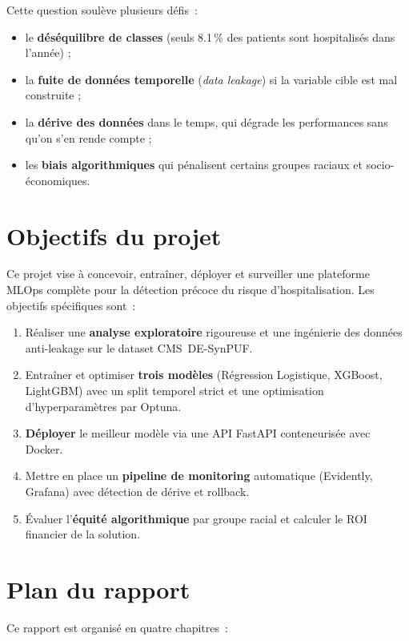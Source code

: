 \noindent Cette question soulève plusieurs défis~:
\begin{itemize}
  \item le \textbf{déséquilibre de classes} (seuls 8.1\,\% des patients sont
        hospitalisés dans l'année) ;
  \item la \textbf{fuite de données temporelle} (\textit{data leakage}) si la
        variable cible est mal construite ;
  \item la \textbf{dérive des données} dans le temps, qui dégrade les performances
        sans qu'on s'en rende compte ;
  \item les \textbf{biais algorithmiques} qui pénalisent certains groupes raciaux
        et socio-économiques.
\end{itemize}

\section*{Objectifs du projet}

Ce projet vise à concevoir, entraîner, déployer et surveiller une plateforme MLOps
complète pour la détection précoce du risque d'hospitalisation. Les objectifs
spécifiques sont~:

\begin{enumerate}
  \item Réaliser une \textbf{analyse exploratoire} rigoureuse et une ingénierie
        des données anti-leakage sur le dataset CMS~DE-SynPUF.
  \item Entraîner et optimiser \textbf{trois modèles} (Régression Logistique,
        XGBoost, LightGBM) avec un split temporel strict et une optimisation
        d'hyperparamètres par Optuna.
  \item \textbf{Déployer} le meilleur modèle via une API FastAPI conteneurisée
        avec Docker.
  \item Mettre en place un \textbf{pipeline de monitoring} automatique (Evidently,
        Grafana) avec détection de dérive et rollback.
  \item Évaluer l'\textbf{équité algorithmique} par groupe racial et calculer le
        ROI financier de la solution.
\end{enumerate}

\section*{Plan du rapport}

Ce rapport est organisé en quatre chapitres~:

